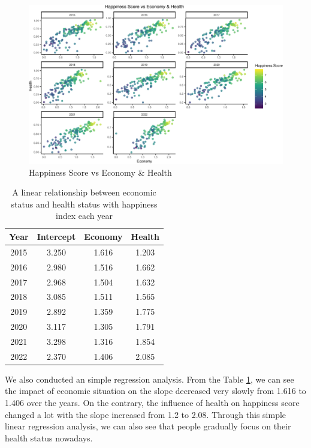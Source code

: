 \documentclass[11pt,a4paper,]{article}
\begin{document}
\begin{figure}
\centering
\includegraphics{Assignment4_files/figure-latex/VS-1.pdf}
\caption{\label{fig:VS}Happiness Score vs Economy \& Health}
\end{figure}

\newpage

\begin{table}
\centering
\begin{tabular}{|c|c|c|c|}
\hline
\textbf{Year} & \textbf{Intercept} & \textbf{Economy} & \textbf{Health} \\
\hline
2015          & 3.250              & 1.616            & 1.203           \\
2016          & 2.980              & 1.516            & 1.662           \\
2017          & 2.968              & 1.504            & 1.632           \\
2018          & 3.085              & 1.511            & 1.565           \\
2019          & 2.892              & 1.359            & 1.775           \\
2020          & 3.117              & 1.305            & 1.791           \\
2021          & 3.298              & 1.316            & 1.854           \\
2022          & 2.370              & 1.406            & 2.085           \\
\hline
\end{tabular}
\caption{A linear relationship between economic status and health status with happiness index each year}
\label{tab:table}
\end{table}

We also conducted an simple regression analysis. From the Table \ref{tab:table}, we can see the impact of economic situation on the slope decreased very slowly from 1.616 to 1.406 over the years. On the contrary, the influence of health on happiness score changed a lot with the slope increased from 1.2 to 2.08. Through this simple linear regression analysis, we can also see that people gradually focus on their health status nowadays.
\end{document}
